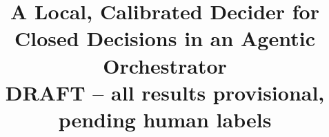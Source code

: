 \documentclass[10pt,conference]{IEEEtran}
\begin{document}
\title{A Local, Calibrated Decider for Closed Decisions in an Agentic Orchestrator\\
\large DRAFT -- all results provisional, pending human labels}
\author{}
\maketitle













\end{document}
